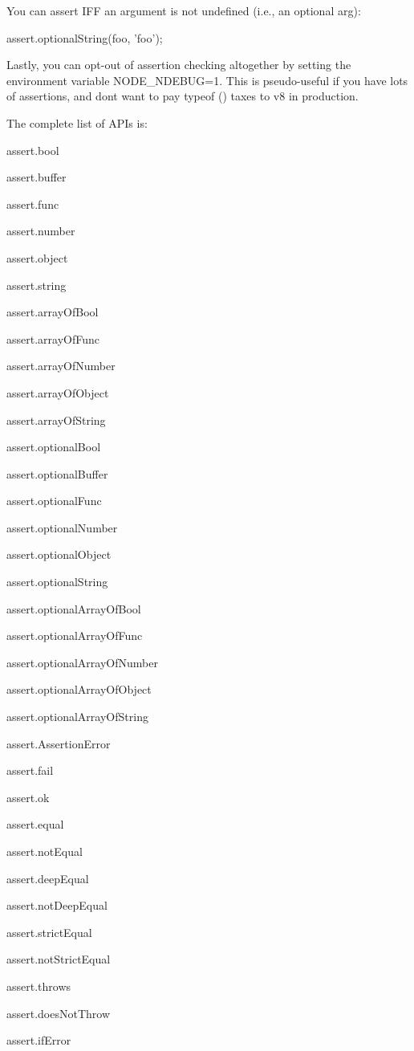 You can assert I\+F\+F an argument is not {\ttfamily undefined} (i.\+e., an optional arg)\+: \begin{DoxyVerb}assert.optionalString(foo, 'foo');
\end{DoxyVerb}


Lastly, you can opt-\/out of assertion checking altogether by setting the environment variable {\ttfamily N\+O\+D\+E\+\_\+\+N\+D\+E\+B\+U\+G=1}. This is pseudo-\/useful if you have lots of assertions, and don\textquotesingle{}t want to pay {\ttfamily typeof ()} taxes to v8 in production.

The complete list of A\+P\+Is is\+:


\begin{DoxyItemize}
\item assert.\+bool
\item assert.\+buffer
\item assert.\+func
\item assert.\+number
\item assert.\+object
\item assert.\+string
\item assert.\+array\+Of\+Bool
\item assert.\+array\+Of\+Func
\item assert.\+array\+Of\+Number
\item assert.\+array\+Of\+Object
\item assert.\+array\+Of\+String
\item assert.\+optional\+Bool
\item assert.\+optional\+Buffer
\item assert.\+optional\+Func
\item assert.\+optional\+Number
\item assert.\+optional\+Object
\item assert.\+optional\+String
\item assert.\+optional\+Array\+Of\+Bool
\item assert.\+optional\+Array\+Of\+Func
\item assert.\+optional\+Array\+Of\+Number
\item assert.\+optional\+Array\+Of\+Object
\item assert.\+optional\+Array\+Of\+String
\item assert.\+Assertion\+Error
\item assert.\+fail
\item assert.\+ok
\item assert.\+equal
\item assert.\+not\+Equal
\item assert.\+deep\+Equal
\item assert.\+not\+Deep\+Equal
\item assert.\+strict\+Equal
\item assert.\+not\+Strict\+Equal
\item assert.\+throws
\item assert.\+does\+Not\+Throw
\item assert.\+if\+Error
\end{DoxyItemize}


